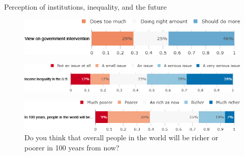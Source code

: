\documentclass[aspectratio=169,9pt,dvipsnames]{beamer}
\begin{document}
\begin{frame}{Perception of institutions, inequality, and the future}%
\vspace{-.2cm}
\begin{figure}[h!]
\caption{Some people think the government is trying to do too many things that should be left to individuals and businesses. Others think that government should do more to solve our country's problems.
Which come closer to your own view? }
\includegraphics[width=.7\textwidth]{../figures/US/view_govt_US.png} \\
\vspace{.1cm}
\caption{How big of an issue do you think income inequality is in the U.S.?}
\includegraphics[width=.7\textwidth]{../figures/US/problem_inequality_US.png}\\
\vspace{.1cm}
\caption{Do you think that overall people in the world will be richer or poorer in 100 years from now?}
\includegraphics[width=.7\textwidth]{../figures/US/future_richness_US.png}
\end{figure}
\end{frame}
\end{document}
